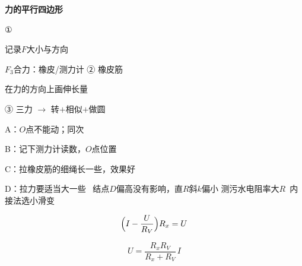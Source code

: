 \textbf{力的平行四边形}

①


记录$F$大小与方向

$F_3$合力：橡皮/测力计
② 橡皮筋


在力的方向上画伸长量


③ 三力 $\to$ 转$+$相似$+$做圆


A：$O$点不能动；同次\ \red{$\checkmark$}

B：记下测力计读数，$O$点位置 %

C：拉橡皮筋的细绳长一些，效果好\ \red{$\checkmark$}\quad {}

D：拉力要适当大一些\ \red{$\checkmark$}
结点$D$偏高没有影响，直$R$斜$k$偏小 %
测污水电阻率\quad 大$R$\ 内接法\quad 选小滑变


\[
\Bigl(I-\frac{U}{R_V}\Bigr)R_x=U
\]

\[
U=\frac{R_xR_V}{R_x+R_V}\,I
\]

\quad{}

